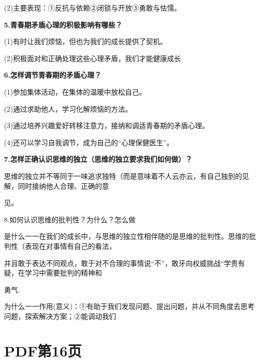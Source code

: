 \documentclass[lang=cn,11pt]{elegantbook}
\newcommand{\daofasym}[1]{{\daofasymbolfont #1}}
\newcommand{\daofasym}[1]{#1}
\begin{document}
(2)主要表现：\daofasym{①}反抗与依赖\daofasym{②}闭锁与开放\daofasym{③}勇敢与怯懦。\par

\textbf{5.青春期矛盾心理的积极影响有哪些？}\par

(1)有时让我们烦恼，但也为我们的成长提供了契机。\par

(2)积极面对和正确处理这些心理矛盾，我们才能健康成长\par

\textbf{6.怎样调节青春期的矛盾心理？}\par

(1)参加集体活动，在集体的温暖中放松自己。\par

(2)通过求助他人，学习化解烦恼的方法。\par

(3)通过培养兴趣爱好转移注意力，接纳和调适青春期的矛盾心理。\par

(4)还可以学习自我调节，成为自己的“心理保健医生”。\par

\textbf{7.怎样正确认识思维的独立（思维的独立要求我们如何做）？}\par

思维的独立并不等同于一味追求独特（而是意味着不人云亦云，有自己独到的见解，同时接纳他人合理、正确的意\par

见。\par

8.如何认识思维的批判性？为什么？怎么做\par

是什么一一在我们的成长中，与思维的独立性相伴随的是思维的批判性。思维的批判性（表现在对事情有自己的看法，\par

并且敢于表达不同观点，敢于对不合理的事情说“不”，敢牙向权威挑战“学贵有疑，在学习中需要批判的精神和\par

勇气.\par

为什么一一作用(意义)：\daofasym{①}有助于我们发现问题、提出问题，并从不同角度去思考问题，探索解决方案；\daofasym{②}能调动我们\par


\section*{PDF第16页}
\end{document}
